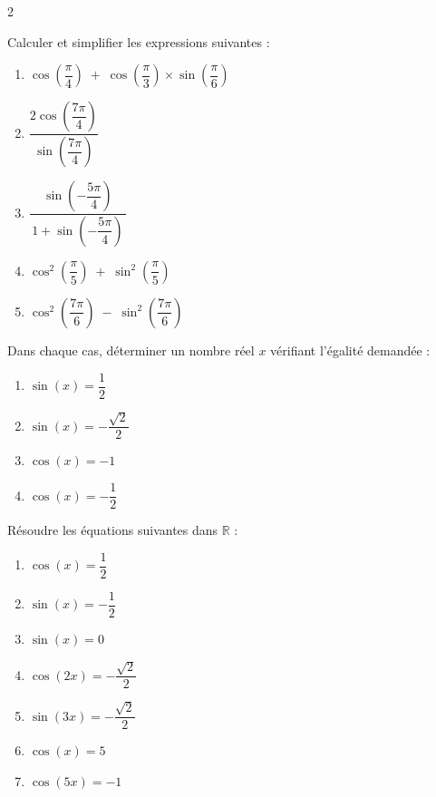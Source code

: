 \documentclass[a4paper,12pt]{article}
\begin{document}
\begin{multicols}{2}
        \begin{exercice}[title=Exercice 21 $\star$ { [Calculer] }]{}{}
        Calculer et simplifier les expressions suivantes :
        \begin{enumerate}
          \item \(\cos\left(\dfrac{\pi}{4}\right) \;+\; \cos\left(\dfrac{\pi}{3}\right) \times \sin\left(\dfrac{\pi}{6}\right)\)
          \item \(\dfrac{2 \cos\left(\dfrac{7\pi}{4}\right)}{\sin\left(\dfrac{7\pi}{4}\right)}\)
          \item \(\dfrac{\sin\left(-\dfrac{5\pi}{4}\right)}{\,1 + \sin\left(-\dfrac{5\pi}{4}\right)\,}\)
          \item \(\cos^2\left(\dfrac{\pi}{5}\right) \;+\; \sin^2\left(\dfrac{\pi}{5}\right)\)
          \item \(\cos^2\left(\dfrac{7\pi}{6}\right) \;-\; \sin^2\left(\dfrac{7\pi}{6}\right)\)
        \end{enumerate}
        \end{exercice}        

        \begin{exercice}[title=Exercice 22 $\star$ { [Représenter] }]{}{}
          Dans chaque cas, déterminer un nombre réel \(x\) vérifiant l’égalité demandée :
          \begin{enumerate}
            \item \(\sin(x) = \dfrac{1}{2}\)
            \item \(\sin(x) = -\dfrac{\sqrt{2}}{2}\)
            \item \(\cos(x) = -1\)
            \item \(\cos(x) = -\dfrac{1}{2}\)
          \end{enumerate}
          \end{exercice}
          
          \begin{exercice}[title=Exercice 23 $\star\star$ { [Représenter] }]{}{}
          Résoudre les équations suivantes dans \(\mathbb{R}\) :
          \begin{enumerate}
            \item \(\cos(x) = \dfrac{1}{2}\)
            \item \(\sin(x) = -\dfrac{1}{2}\)
            \item \(\sin(x) = 0\)
            \item \(\cos(2x) = -\dfrac{\sqrt{2}}{2}\)
            \item \(\sin(3x) = -\dfrac{\sqrt{2}}{2}\)
            \item \(\cos(x) = 5\)
            \item \(\cos(5x) = -1\)
          \end{enumerate}
          \end{exercice}
          

\end{multicols}
\end{document}
